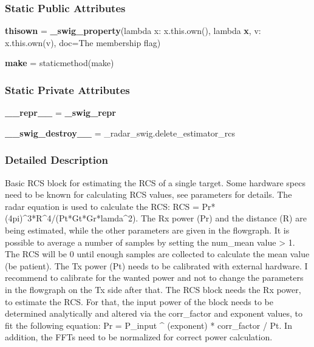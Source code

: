 \subsubsection*{Static Public Attributes}
\begin{DoxyCompactItemize}
\item 
{\bf thisown} = {\bf \+\_\+swig\+\_\+property}(lambda x\+: x.\+this.\+own(), lambda {\bf x}, v\+: x.\+this.\+own(v), doc=\textquotesingle{}The membership flag\textquotesingle{})
\item 
{\bf make} = staticmethod(make)
\end{DoxyCompactItemize}
\subsubsection*{Static Private Attributes}
\begin{DoxyCompactItemize}
\item 
{\bf \+\_\+\+\_\+repr\+\_\+\+\_\+} = {\bf \+\_\+swig\+\_\+repr}
\item 
{\bf \+\_\+\+\_\+swig\+\_\+destroy\+\_\+\+\_\+} = \+\_\+radar\+\_\+swig.\+delete\+\_\+estimator\+\_\+rcs
\end{DoxyCompactItemize}


\subsubsection{Detailed Description}
\begin{DoxyVerb}Basic RCS block for estimating the RCS of a single target. Some hardware specs need to be known for calculating RCS values, see parameters for details. The radar equation is used to calculate the RCS: RCS = Pr*(4pi)^3*R^4/(Pt*Gt*Gr*lamda^2). The Rx power (Pr) and the distance (R) are being estimated, while the other parameters are given in the flowgraph. It is possible to average a number of samples by setting the num_mean value > 1. The RCS will be 0 until enough samples are collected to calculate the mean value (be patient). The Tx power (Pt) needs to be calibrated with external hardware. I recommend to calibrate for the wanted power and not to change the parameters in the flowgraph on the Tx side after that. The RCS block needs the Rx power, to estimate the RCS. For that, the input power of the block needs to be determined analytically and altered via the corr_factor and exponent values, to fit the following equation: Pr = P_input ^ (exponent) * corr_factor / Pt. In addition, the FFTs need to be normalized for correct power calculation.\end{DoxyVerb}
 

